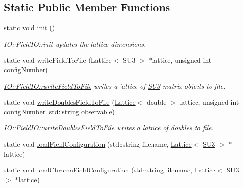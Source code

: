 \subsection*{Static Public Member Functions}
\begin{DoxyCompactItemize}
\item 
static void \mbox{\hyperlink{class_i_o_1_1_field_i_o_a9093930584128c73a63fe8015bff9b38}{init}} ()
\begin{DoxyCompactList}\small\item\em \mbox{\hyperlink{class_i_o_1_1_field_i_o_a9093930584128c73a63fe8015bff9b38}{I\+O\+::\+Field\+I\+O\+::init}} updates the lattice dimensions. \end{DoxyCompactList}\item 
static void \mbox{\hyperlink{class_i_o_1_1_field_i_o_a8af607f9a1d79e90d4514c36103c6601}{write\+Field\+To\+File}} (\mbox{\hyperlink{class_lattice}{Lattice}}$<$ \mbox{\hyperlink{class_s_u3}{S\+U3}} $>$ $\ast$lattice, unsigned int config\+Number)
\begin{DoxyCompactList}\small\item\em \mbox{\hyperlink{class_i_o_1_1_field_i_o_a8af607f9a1d79e90d4514c36103c6601}{I\+O\+::\+Field\+I\+O\+::write\+Field\+To\+File}} writes a lattice of \mbox{\hyperlink{class_s_u3}{S\+U3}} matrix objects to file. \end{DoxyCompactList}\item 
static void \mbox{\hyperlink{class_i_o_1_1_field_i_o_aaf2bac2025d67c06e7c61e8cc9f44777}{write\+Doubles\+Field\+To\+File}} (\mbox{\hyperlink{class_lattice}{Lattice}}$<$ double $>$ lattice, unsigned int config\+Number, std\+::string observable)
\begin{DoxyCompactList}\small\item\em \mbox{\hyperlink{class_i_o_1_1_field_i_o_aaf2bac2025d67c06e7c61e8cc9f44777}{I\+O\+::\+Field\+I\+O\+::write\+Doubles\+Field\+To\+File}} writes a lattice of doubles to file. \end{DoxyCompactList}\item 
static void \mbox{\hyperlink{class_i_o_1_1_field_i_o_a02db864a48601edd7febaab5d655e495}{load\+Field\+Configuration}} (std\+::string filename, \mbox{\hyperlink{class_lattice}{Lattice}}$<$ \mbox{\hyperlink{class_s_u3}{S\+U3}} $>$ $\ast$lattice)
\item 
static void \mbox{\hyperlink{class_i_o_1_1_field_i_o_af23fb6e02a6bd1cafd5be4acacbf848e}{load\+Chroma\+Field\+Configuration}} (std\+::string filename, \mbox{\hyperlink{class_lattice}{Lattice}}$<$ \mbox{\hyperlink{class_s_u3}{S\+U3}} $>$ $\ast$lattice)
\end{DoxyCompactItemize}


